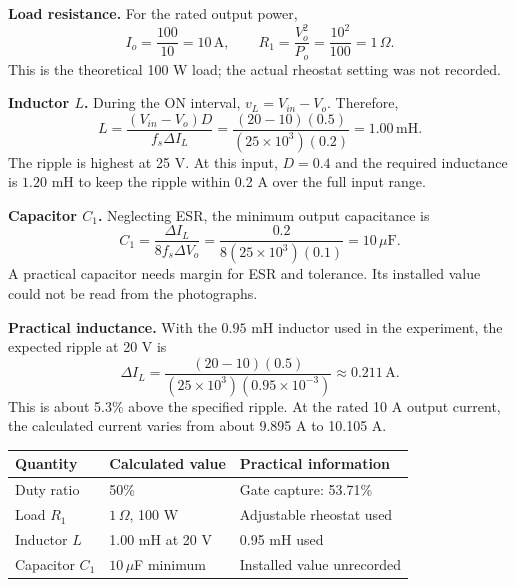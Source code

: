 \documentclass[11pt,a4paper]{article}
\begin{document}
\textbf{Load resistance.} For the rated output power,
\begin{equation}
I_o=\frac{100}{10}=10\,\mathrm{A},\qquad R_1=\frac{V_o^2}{P_o}=\frac{10^2}{100}=1\,\Omega.
\end{equation}
This is the theoretical 100 W load; the actual rheostat setting was not recorded.

\newpage
\textbf{Inductor $L$.} During the ON interval, $v_L=V_{in}-V_o$. Therefore,
\begin{equation}
L=\frac{(V_{in}-V_o)D}{f_s\Delta I_L}
=\frac{(20-10)(0.5)}{(25\times10^3)(0.2)}=1.00\,\mathrm{mH}.
\end{equation}
The ripple is highest at 25 V. At this input, $D=0.4$ and the required inductance is $1.20$ mH to keep the ripple within 0.2 A over the full input range.

\textbf{Capacitor $C_1$.} Neglecting ESR, the minimum output capacitance is
\begin{equation}
C_1=\frac{\Delta I_L}{8f_s\Delta V_o}
=\frac{0.2}{8(25\times10^3)(0.1)}=10\,\mu\mathrm{F}.
\end{equation}
A practical capacitor needs margin for ESR and tolerance. Its installed value could not be read from the photographs.

\textbf{Practical inductance.} With the $0.95$ mH inductor used in the experiment, the expected ripple at 20 V is
\begin{equation}
\Delta I_L=\frac{(20-10)(0.5)}{(25\times10^3)(0.95\times10^{-3})}
\approx0.211\,\mathrm{A}.
\end{equation}
This is about 5.3\% above the specified ripple. At the rated 10 A output current, the calculated current varies from about 9.895 A to 10.105 A.

\begin{center}
\begin{tabular}{lll}\toprule
Quantity & Calculated value & Practical information\\\midrule
Duty ratio & 50\% & Gate capture: 53.71\%\\
Load $R_1$ & $1\,\Omega$, 100 W & Adjustable rheostat used\\
Inductor $L$ & 1.00 mH at 20 V & 0.95 mH used\\
Capacitor $C_1$ & $10\,\mu$F minimum & Installed value unrecorded\\\bottomrule
\end{tabular}
\end{center}
\end{document}
